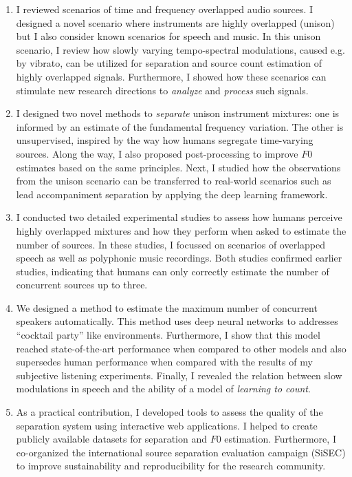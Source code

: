 \begin{enumerate}
\item I reviewed scenarios of time and frequency overlapped audio sources.
I designed a novel scenario where instruments are highly overlapped (unison) but I also consider known scenarios for speech and music.
In this unison scenario, I review how slowly varying tempo-spectral modulations, caused e.g. by vibrato, can be utilized for separation and source count estimation of highly overlapped signals.
Furthermore, I showed how these scenarios can stimulate new research directions to \emph{analyze} and \emph{process} such signals.

\item I designed two novel methods to \emph{separate} unison instrument mixtures: one is informed by an estimate of the fundamental frequency variation.
The other is unsupervised, inspired by the way how humans segregate time-varying sources.
Along the way, I also proposed post-processing to improve \(F0\) estimates based on the same principles.
Next, I studied how the observations from the unison scenario can be transferred to real-world scenarios such as lead accompaniment separation by applying the deep learning framework.

\item I conducted two detailed experimental studies to assess how humans perceive highly overlapped mixtures and how they perform when asked to estimate the number of sources.
In these studies, I focussed on scenarios of overlapped speech as well as polyphonic music recordings.
Both studies confirmed earlier studies, indicating that humans can only correctly estimate the number of concurrent sources up to three.

\item We designed a method to estimate the maximum number of concurrent speakers automatically. This method uses deep neural networks to addresses ``cocktail party'' like environments.
Furthermore, I show that this model reached state-of-the-art performance when compared to other models and also supersedes human performance when compared with the results of my subjective listening experiments.
Finally, I revealed the relation between slow modulations in speech and the ability of a model of \emph{learning to count}.

\item As a practical contribution, I developed tools to assess the quality of the separation system using interactive web applications. 
I helped to create publicly available datasets for separation and \(F0\) estimation.
Furthermore, I co-organized the international source separation evaluation campaign (SiSEC) to improve sustainability and reproducibility for the research community.
\end{enumerate}

